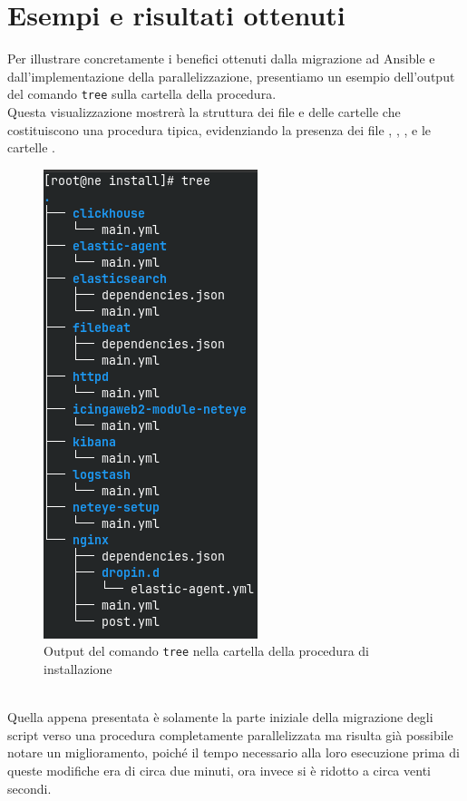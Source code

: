 \section{Esempi e risultati ottenuti}
\label{sec:esempi_risultati}

Per illustrare concretamente i benefici ottenuti dalla migrazione ad Ansible e dall'implementazione
della parallelizzazione, presentiamo un esempio dell'output del comando \texttt{tree}
sulla cartella della procedura.\\ Questa visualizzazione mostrerà la struttura dei
file e delle cartelle che costituiscono una procedura tipica, evidenziando la
presenza dei file , , , e
le cartelle .
\begin{figure}[h]
  \centering
  \includegraphics[width=.3\textwidth]{images/tree_install.png}
  \caption{Output del comando \texttt{tree} nella cartella della procedura di installazione}
  \label{fig:struttura_file_install}
\end{figure}\\ Quella appena presentata è solamente la parte iniziale della migrazione
degli script verso una procedura completamente parallelizzata ma risulta già possibile
notare un miglioramento, poiché il tempo necessario alla loro esecuzione prima
di queste modifiche era di circa due minuti, ora invece si è ridotto a circa venti
secondi.
